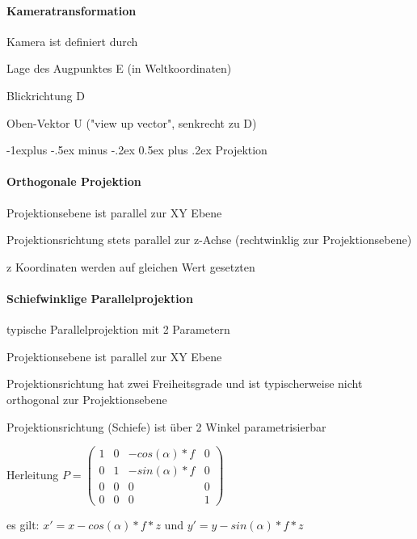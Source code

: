 \documentclass[landscape]{article}
\makeatletter
\renewcommand{\subsection}{\@startsection{subsection}{2}{0mm}%
                                {-1explus -.5ex minus -.2ex}%
                                {0.5ex plus .2ex}%
                                {\normalfont\normalsize\bfseries}}
\makeatother
\begin{document}
\begin{multicols}{3}
  \paragraph{Kameratransformation}
  Kamera ist definiert durch
  \begin{itemize*}
    \item Lage des Augpunktes E (in Weltkoordinaten)
    \item Blickrichtung D
    \item Oben-Vektor U ("view up vector", senkrecht zu D)
  \end{itemize*}
  
  \subsection{Projektion}
  \paragraph{Orthogonale Projektion}
  \begin{itemize*}
    \item Projektionsebene ist parallel zur XY Ebene
    \item Projektionsrichtung stets parallel zur z-Achse (rechtwinklig zur Projektionsebene)
    \item z Koordinaten werden auf gleichen Wert gesetzten
  \end{itemize*}
  
  \paragraph{Schiefwinklige Parallelprojektion}
  \begin{itemize*}
    \item typische Parallelprojektion mit 2 Parametern
    \item Projektionsebene ist parallel zur XY Ebene
    \item Projektionsrichtung hat zwei Freiheitsgrade und ist typischerweise nicht orthogonal zur Projektionsebene
    \item Projektionsrichtung (Schiefe) ist über 2 Winkel parametrisierbar
    \item Herleitung $P=\begin{pmatrix}
        1 & 0 & -cos(\alpha)*f & 0  \\
        0 & 1 & -sin(\alpha)*f & 0  \\
        0 & 0 & 0              & 0  \\
        0 & 0 & 0              & 1 
      \end{pmatrix}$
    \item es gilt: $x'=x-cos(\alpha)*f*z$ und $y'=y-sin(\alpha)*f*z$
  \end{itemize*}
  

\end{multicols}
\end{document}
